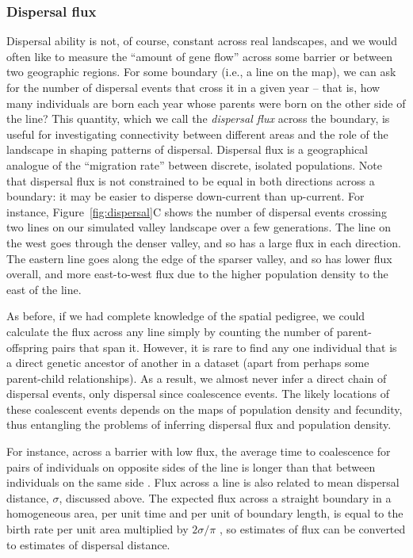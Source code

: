 \documentclass{ar-1col}
\begin{document}
\subsubsection{Dispersal flux}

Dispersal ability is not, of course, constant across real landscapes, and
we would often like to measure the ``amount of gene flow'' across some barrier
or between two geographic regions.
For some boundary (i.e., a line on the map),
we can ask for the number of dispersal events that cross it in a given year -- 
that is, 
how many individuals are born each year whose parents
were born on the other side of the line?
This quantity, which we call the \textit{dispersal flux} across the boundary,
is useful for investigating connectivity between different areas
and the role of the landscape in shaping patterns of dispersal.
Dispersal flux is a geographical analogue of
the ``migration rate'' between discrete, isolated populations. 
Note that dispersal flux is not constrained to be equal in both directions across a boundary:
it may be easier to disperse down-current than up-current.
For instance, Figure~\ref{fig:dispersal}C
shows the number of dispersal events crossing two lines on our simulated valley landscape
over a few generations.
The line on the west goes through the denser valley, 
and so has a large flux in each direction.
The eastern line goes along the edge of the sparser valley,
and so has lower flux overall, and more east-to-west flux
due to the higher population density to the east of the line.

As before, if we had complete knowledge of the spatial pedigree,
we could calculate the flux across any line simply by counting the number of
parent-offspring pairs that span it.
However, it is rare to find any one individual
that is a direct genetic ancestor of another in a dataset
(apart from perhaps some parent-child relationships).
As a result, we almost never infer a direct chain of dispersal events,
only dispersal since coalescence events.
The likely locations of these coalescent events
depends on the maps of population density and fecundity,
thus entangling
the problems of inferring dispersal flux and population density.

For instance, across a barrier with low flux,
the average time to coalescence for pairs of individuals on opposite sides of the line
is longer than that between individuals on the same side \citep{bedassle,Duforet-Frebourg_Blum_2014,ringbauer2018estimating}.
Flux across a line is also related to mean dispersal distance, $\sigma$, discussed above.
The expected flux across a straight boundary in a homogeneous area,
per unit time and per unit of boundary length,
is equal to the birth rate per unit area multiplied by $2 \sigma / \pi$
\citep{buffon1777},
so estimates of flux can be converted to estimates of dispersal distance.
\end{document}
